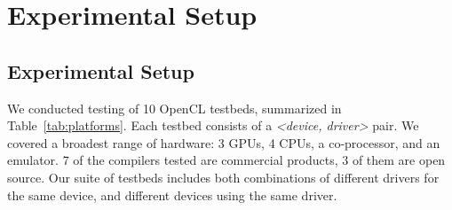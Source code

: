 \section{Experimental Setup}

\subsection{Experimental Setup}

\begin{table*}[t!]
  \scriptsize %
  \centering %
  
  \caption{%
    OpenCL testbeds, the time spent in automated testing, and the number of bug reports submitted to date.%
  }
  \label{tab:platforms}
\end{table*}

We conducted testing of 10 OpenCL testbeds, summarized in Table~\ref{tab:platforms}. Each testbed consists of a \emph{<device, driver>} pair. We covered a broadest range of hardware: 3 GPUs, 4 CPUs, a co-processor, and an emulator. 7 of the compilers tested are commercial products, 3 of them are open source. Our suite of testbeds includes both combinations of different drivers for the same device, and different devices using the same driver.